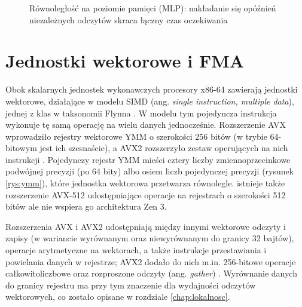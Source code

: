 \documentclass[a4paper,12pt]{book} %
\begin{document}
\begin{figure}[t!]
\centering
{}
\caption{Równoległość na poziomie pamięci (MLP): nakładanie się opóźnień niezależnych odczytów skraca łączny czas oczekiwania}
\label{rys:mlp}
\end{figure}

\section{Jednostki wektorowe i FMA}
\label{sec:avx}

Obok skalarnych jednostek wykonawczych procesory x86-64 zawierają jednostki wektorowe, działające w modelu SIMD (ang. \emph{single instruction, multiple data}), jednej z klas w taksonomii Flynna \cite{flynn1972taxonomy}. W modelu tym pojedyncza instrukcja wykonuje tę samą operację na wielu danych jednocześnie. Rozszerzenie AVX wprowadziło rejestry wektorowe YMM o szerokości 256 bitów (w trybie 64-bitowym jest ich szesnaście), a AVX2 rozszerzyło zestaw operujących na nich instrukcji \cite{amd64_apm_vol1}. Pojedynczy rejestr YMM mieści cztery liczby zmiennoprzecinkowe podwójnej precyzji (po 64 bity) albo osiem liczb pojedynczej precyzji (rysunek \ref{rys:ymm}), które jednostka wektorowa przetwarza równolegle. istnieje także rozszerzenie AVX-512 udostępniające operacje na rejestrach o szerokości 512 bitów ale nie wspiera go architektura Zen 3.

Rozszerzenia AVX i AVX2 udostępniają między innymi wektorowe odczyty i zapisy (w wariancie wyrównanym oraz niewyrównanym do granicy 32 bajtów), operacje arytmetyczne na wektorach, a także instrukcje przestawiania i powielania danych w rejestrze; AVX2 dodało do nich m.in. 256-bitowe operacje całkowitoliczbowe oraz rozproszone odczyty (ang. \emph{gather}) \cite{gepner2017avx2}. Wyrównanie danych do granicy rejestru ma przy tym znaczenie dla wydajności odczytów wektorowych, co zostało opisane w rozdziale \ref{chap:lokalnosc}.
\end{document}
